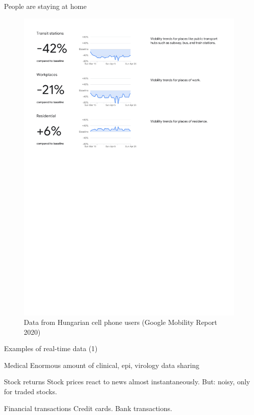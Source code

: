 \documentclass[
  ignorenonframetext,
  aspectratio=1610,
]{beamer}
\begin{document}
\begin{frame}{People are staying at home}
\protect\hypertarget{people-are-staying-at-home}{}
\begin{figure}
\centering
\includegraphics[width=1\textwidth,height=\textheight]{exhibit/fig/gmr-home.pdf}
\caption{Data from Hungarian cell phone users (Google Mobility Report
2020)}
\end{figure}
\end{frame}

\begin{frame}{Examples of real-time data (1)}
\protect\hypertarget{examples-of-real-time-data-1}{}
\begin{block}{Medical}
\protect\hypertarget{medical}{}
Enormous amount of clinical, epi, virology data sharing
\end{block}

\begin{block}{Stock returns}
\protect\hypertarget{stock-returns}{}
Stock prices react to news almost instantaneously. But: noisy, only for
traded stocks.
\end{block}

\begin{block}{Financial transactions}
\protect\hypertarget{financial-transactions}{}
Credit cards. Bank transactions.
\end{block}
\end{frame}
\end{document}
